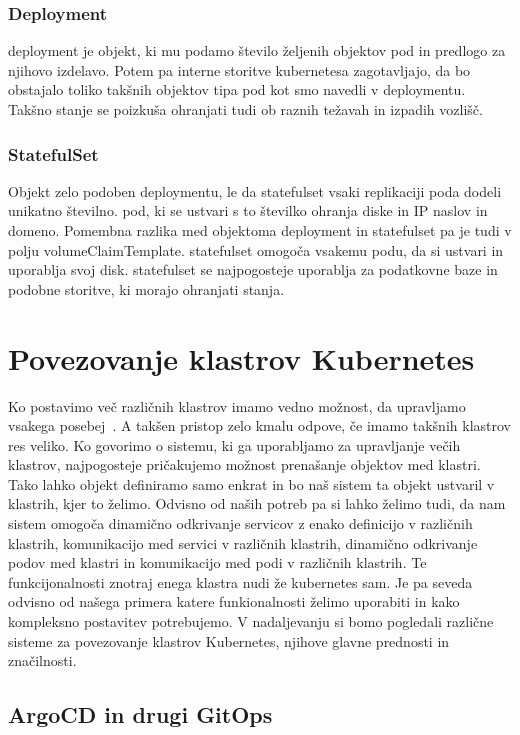 \documentclass[a4paper, 12pt]{book}
\begin{document}
\subsection{Deployment~\cite{deployment}}
deployment je objekt, ki mu podamo število željenih objektov pod in predlogo za njihovo izdelavo.
Potem pa interne storitve kubernetesa zagotavljajo, da bo obstajalo toliko takšnih objektov tipa pod kot smo navedli v deploymentu.
Takšno stanje se poizkuša ohranjati tudi ob raznih težavah in izpadih vozlišč.
\subsection{StatefulSet~\cite{statefulset}}
Objekt zelo podoben deploymentu, le da statefulset vsaki replikaciji poda dodeli unikatno številno. 
pod, ki se ustvari s to številko ohranja diske in IP naslov in domeno.
Pomembna razlika med objektoma deployment in statefulset pa je tudi v polju volumeClaimTemplate.
statefulset omogoča vsakemu podu, da si ustvari in uporablja svoj disk.
statefulset se najpogosteje uporablja za podatkovne baze in podobne storitve, ki morajo ohranjati stanja.
\chapter{Povezovanje klastrov Kubernetes }
Ko postavimo več različnih klastrov imamo vedno možnost, da upravljamo vsakega posebej~\cite{difference-multi-cluster}.
A takšen pristop zelo kmalu odpove, če imamo takšnih klastrov res veliko.
Ko govorimo o sistemu, ki ga uporabljamo za upravljanje večih klastrov, najpogosteje pričakujemo možnost prenašanje objektov med klastri.
Tako lahko objekt definiramo samo enkrat in bo naš sistem ta objekt ustvaril v klastrih, kjer to želimo.
Odvisno od naših potreb pa si lahko želimo tudi, da nam sistem omogoča dinamično odkrivanje servicov z enako definicijo v različnih klastrih, komunikacijo med servici v različnih klastrih, dinamično odkrivanje podov med klastri in komunikacijo med podi v različnih klastrih.
Te funkcijonalnosti znotraj enega klastra nudi že kubernetes sam.
Je pa seveda odvisno od našega primera katere funkionalnosti želimo uporabiti in kako kompleksno postavitev potrebujemo.
V nadaljevanju si bomo pogledali različne sisteme za povezovanje klastrov Kubernetes, njihove glavne prednosti in značilnosti.
  \section{ArgoCD in drugi GitOps}
\end{document}
